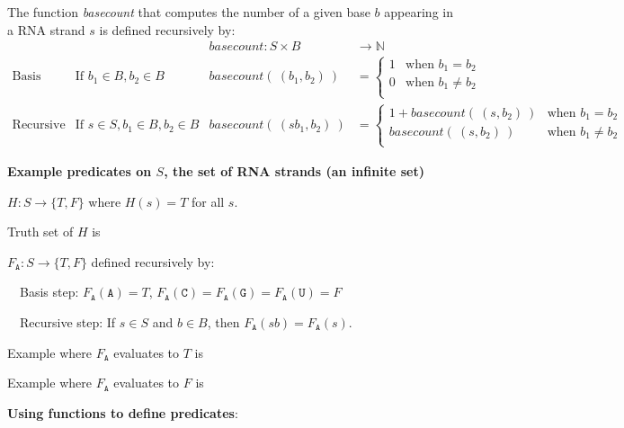 \documentclass[12pt, oneside]{article}
\newcommand{\A}[0]{\texttt{A}}
\newcommand{\C}[0]{\texttt{C}}
\newcommand{\G}[0]{\texttt{G}}
\newcommand{\U}[0]{\texttt{U}}
\begin{document}
The function \textit{basecount} that computes the number of a given base 
$b$ appearing in a RNA strand $s$ is defined recursively by:
\[
\begin{array}{llll}
& & \textit{basecount} : S \times B & \to \mathbb{N} \\
\textrm{Basis Step:} &  \textrm{If } b_1 \in B, b_2 \in B & \textit{basecount}(~(b_1, b_2)~) & =
        \begin{cases}
            1 & \textrm{when } b_1 = b_2 \\
            0 & \textrm{when } b_1 \neq b_2 \\
        \end{cases} \\
\textrm{Recursive Step:} & \textrm{If } s \in S, b_1 \in B, b_2 \in B &\textit{basecount}(~(s b_1, b_2)~) & =
        \begin{cases}
            1 + \textit{basecount}(~(s, b_2)~) & \textrm{when } b_1 = b_2 \\
            \textit{basecount}(~(s, b_2)~) & \textrm{when } b_1 \neq b_2 \\
        \end{cases}
\end{array}
\] 

{\bf Example predicates on $S$, the set of RNA strands (an infinite set)}


$H: S \to \{T, F\}$ where $H(s) = T$ for all $s$.

Truth set of $H$ is \underline{}

\vfill

$F_{\A}: S \to \{T, F\}$  defined recursively by: 

~~Basis step: $F_{\A}(\A) = T$, $F_{\A}(\C) = F_{\A}(\G) = F_{\A}(\U) = F$

~~Recursive step: If $s \in S$ and $b \in B$, then $F_{\A}(sb) = F_{\A}(s)$.

Example where $F_{\A}$ evaluates to $T$ is \underline{\phantom{$\A\C\G$~\hspace{1in}}}

\vfill

Example where $F_{\A}$ evaluates to $F$ is \underline{\phantom{$\U\A\C\U$\hspace{1in}}}

\vfill \newpage


{\bf Using functions to define predicates}:

\end{document}
